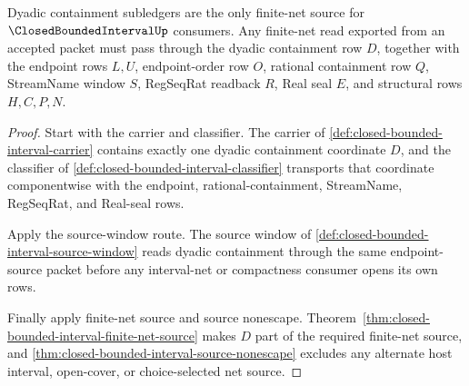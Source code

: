 \begin{theorem}
\label{thm:closedboundedinterval-dyadic-net-ledger}
Dyadic containment subledgers are the only finite-net source for $\ClosedBoundedIntervalUp$ consumers. Any finite-net read exported from an accepted packet must pass through the dyadic containment row $D$, together with the endpoint rows $L,U$, endpoint-order row $O$, rational containment row $Q$, StreamName window $S$, RegSeqRat readback $R$, Real seal $E$, and structural rows $H,C,P,N$.
\end{theorem}
\begin{proof}
Start with the carrier and classifier. The carrier of \autoref{def:closed-bounded-interval-carrier} contains exactly one dyadic containment coordinate $D$, and the classifier of \autoref{def:closed-bounded-interval-classifier} transports that coordinate componentwise with the endpoint, rational-containment, StreamName, RegSeqRat, and Real-seal rows.

Apply the source-window route. The source window of \autoref{def:closed-bounded-interval-source-window} reads dyadic containment through the same endpoint-source packet before any interval-net or compactness consumer opens its own rows.

Finally apply finite-net source and source nonescape. Theorem~\ref{thm:closed-bounded-interval-finite-net-source} makes $D$ part of the required finite-net source, and \autoref{thm:closed-bounded-interval-source-nonescape} excludes any alternate host interval, open-cover, or choice-selected net source.
\end{proof}

